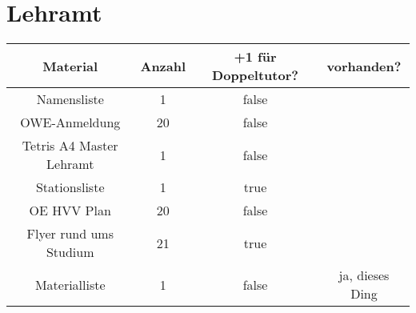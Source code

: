 \documentclass[10pt,a4paper,oneside,ngerman,numbers=noenddot]{scrartcl}
\begin{document}
\section{Lehramt}

	\begin{tabular}{c|c|c|c}
		\textbf{Material} & \textbf{Anzahl} & \textbf{+1 für Doppeltutor?} & \textbf{vorhanden?} \\
		\hline
		Namensliste & 1 & false & \\
		\hline
		OWE-Anmeldung & 20 & false & \\
		\hline
		Tetris A4 Master Lehramt & 1 & false & \\
		\hline
		Stationsliste & 1 & true & \\
		\hline
		OE HVV Plan & 20 & false & \\
		\hline
		Flyer rund ums Studium & 21 & true & \\
		\hline
		Materialliste & 1 & false & ja, dieses Ding \\
	\end{tabular}
\end{document}
